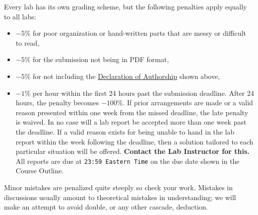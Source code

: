 Every lab has its own grading scheme, but the following penalties apply equally to all labs:
\begin{itemize}
  \item{
    \(-5\%\) for poor organization or hand-written parts that are messy or difficult to read,
  }
  \item{
    \(-5\%\) for the submission not being in PDF format,
  }
  \item{
  	\(-5\%\) for not including the \hyperlink{intro:decl}{Declaration of Authorship} shown above,}
  \item{
    \(-1\%\) per hour within the first 24 hours past the submission deadline. After 24 hours, the penalty becomes \(-100\%\). If prior arrangements are made or a valid reason presented within one week from the missed deadline, the late penalty is waived. In no case will a lab report be accepted more than one week past the deadline. If a valid reason exists for being unable to hand in the lab report
    within the week following the deadline, then a solution tailored to each particular situation will be offered.  \textbf{Contact the Lab Instructor for this.}
    All reports are due at \texttt{23:59 Eastern Time} on the due date shown in the Course Outline.
   }
\end{itemize}
Minor mistakes are penalized quite steeply so check your work.
Mistakes in discussions usually amount to theoretical mistakes in understanding;
we will make an attempt to avoid double, or any other cascade, deduction.
